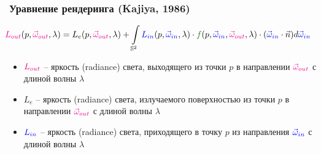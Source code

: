 \documentclass[handout,10pt]{beamer}
\begin{document}
\begin{frame}[fragile]
\frametitle{Уравнение рендеринга (Kajiya, 1986)}
\begin{equation*}
\hspace*{-0.5cm}
{\color{magenta}L_{out}}(p, {\color{magenta}\vec\omega_{out}}, \lambda) = L_{e}(p, {\color{magenta}\vec\omega_{out}}, \lambda)+\int\limits_{\mathbb S^2} {\color{blue}L_{in}}(p, {\color{blue}\vec\omega_{in}}, \lambda) \cdot {\color{green}f}(p, {\color{blue}\vec\omega_{in}}, {\color{magenta}\vec\omega_{out}}, \lambda) \cdot ({\color{blue}\vec\omega_{in}} \cdot \vec{n}) d{\color{blue}\vec\omega_{in}}
\end{equation*}
\hspace*{-0.5cm}
\pause
\begin{itemize}
\item \begin{math}{\color{magenta}L_{out}}\end{math} -- яркость (radiance) света, выходящего из точки \begin{math}p\end{math} в направлении \begin{math}{\color{magenta}\vec\omega_{out}}\end{math} с длиной волны \begin{math}\lambda\end{math}
\pause
\item \begin{math}L_{e}\end{math} -- яркость (radiance) света, излучаемого поверхностью из точки \begin{math}p\end{math} в направлении \begin{math}{\color{magenta}\vec\omega_{out}}\end{math} с длиной волны \begin{math}\lambda\end{math}
\pause
\item \begin{math}{\color{blue}L_{in}}\end{math} -- яркость (radiance) света, приходящего в точку \begin{math}p\end{math} из направления \begin{math}{\color{blue}\vec\omega_{in}}\end{math} с длиной волны \begin{math}\lambda\end{math}

\end{itemize}
\end{frame}
\end{document}

